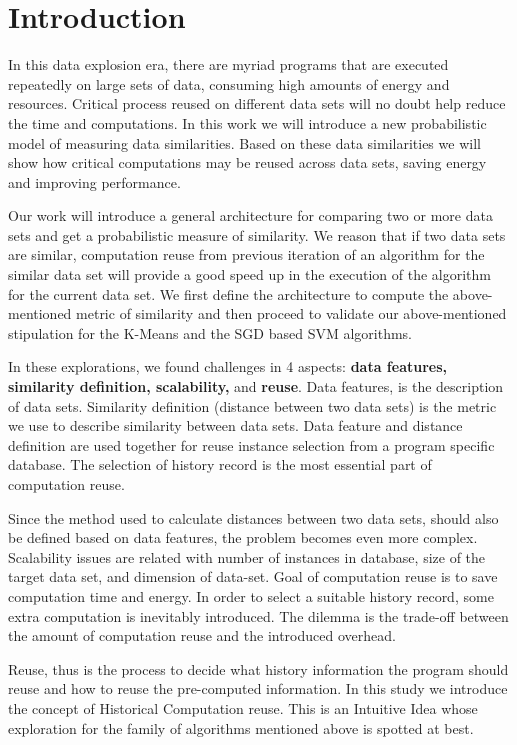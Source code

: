 \documentclass{vldb}
\begin{document}
\section{Introduction}
In this data explosion era, there are myriad programs that are executed repeatedly on large sets of data, consuming high amounts of energy and resources. Critical process reused on different data sets will no doubt help reduce the time and computations. In this work we will introduce a new probabilistic model of measuring data similarities. Based on these data similarities we will show how critical computations may be reused across data sets, saving energy and improving performance.

Our work will introduce a general architecture for comparing two or more data sets and get a probabilistic measure of similarity. We reason that if two data sets are similar, computation reuse from previous iteration of an algorithm for the similar data set will provide a good speed up in the execution of the algorithm for the current data set.
We first define the architecture to compute the above-mentioned metric of similarity and then proceed to validate our above-mentioned stipulation for the K-Means and the SGD based SVM algorithms.

In these explorations, we found challenges in 4 aspects: \textbf{data features, similarity definition, scalability,} and \textbf{reuse}. Data features, is the description of data sets. Similarity definition (distance between two data sets) is the metric we use to describe similarity between data sets. Data feature and distance definition are used together for reuse instance selection from a program specific database. The selection of history record is the most essential part of computation reuse.

Since the method used to calculate distances between two data sets, should also be defined based on data features, the problem becomes even more complex. Scalability issues are related with number of instances in database, size of the target data set, and dimension of data-set. Goal of computation reuse is to save computation time and energy. In order to select a suitable history record, some extra computation is inevitably introduced. The dilemma is the trade-off between the amount of computation reuse and the introduced overhead. 

Reuse, thus is the process to decide what history information the program should reuse and how to reuse the pre-computed information.
In this study we introduce the concept of Historical Computation reuse. This is an Intuitive Idea whose exploration for the family of algorithms mentioned above is spotted at best.
\end{document}
